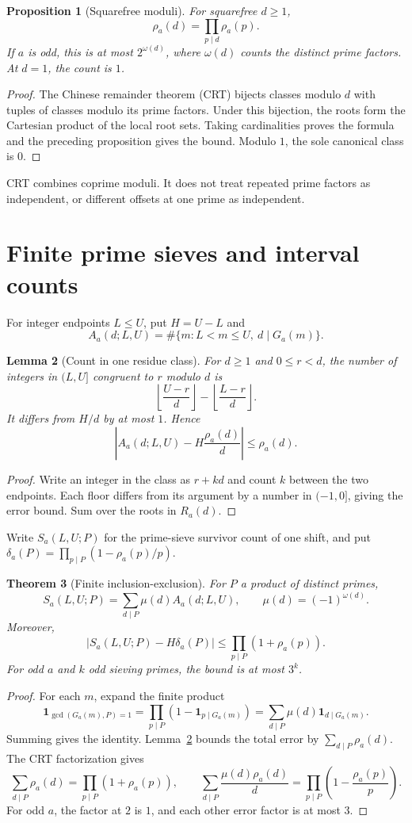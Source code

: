 \documentclass[11pt]{article}
\newtheorem{theorem}{Theorem}[section]
\newtheorem{proposition}[theorem]{Proposition}
\newtheorem{lemma}[theorem]{Lemma}
\theoremstyle{definition}
\theoremstyle{remark}
\newcommand{\ind}{\mathbf 1}
\begin{document}
\begin{proposition}[Squarefree moduli]\label{prop:crt}
For squarefree $d\ge1$,
\[
 \rho_a(d)=\prod_{p\mid d}\rho_a(p).
\]
If $a$ is odd, this is at most $2^{\omega(d)}$, where $\omega(d)$
counts the distinct prime factors. At $d=1$, the count is $1$.
\end{proposition}
\begin{proof}
The Chinese remainder theorem (CRT) bijects classes modulo $d$ with
tuples of classes modulo its prime factors. Under this bijection,
the roots form the Cartesian product of the local root sets.
Taking cardinalities proves the formula and the preceding proposition
gives the bound. Modulo $1$, the sole canonical class is $0$.
\end{proof}

CRT combines coprime moduli. It does not treat repeated prime factors
as independent, or different offsets at one prime as independent.

\section{Finite prime sieves and interval counts}
For integer endpoints $L\le U$, put $H=U-L$ and
\[
 A_a(d;L,U)=\#\{m:L<m\le U,\ d\mid G_a(m)\}.
\]
\begin{lemma}[Count in one residue class]\label{lem:interval}
For $d\ge1$ and $0\le r<d$, the number of integers in $(L,U]$
congruent to $r$ modulo $d$ is
\[
 \left\lfloor\frac{U-r}{d}\right\rfloor-
 \left\lfloor\frac{L-r}{d}\right\rfloor.
\]
It differs from $H/d$ by at most $1$. Hence
\[
 \left|A_a(d;L,U)-H\frac{\rho_a(d)}d\right|\le\rho_a(d).
\]
\end{lemma}
\begin{proof}
Write an integer in the class as $r+kd$ and count $k$ between the
two endpoints. Each floor differs from its argument by a number in
$(-1,0]$, giving the error bound. Sum over the roots in $R_a(d)$.
\end{proof}

Write $S_a(L,U;P)$ for the prime-sieve survivor count of one shift,
and put $\delta_a(P)=\prod_{p\mid P}(1-\rho_a(p)/p)$.
\begin{theorem}[Finite inclusion-exclusion]\label{thm:sieve}
For $P$ a product of distinct primes,
\[
 S_a(L,U;P)=\sum_{d\mid P}\mu(d)A_a(d;L,U),
 \qquad \mu(d)=(-1)^{\omega(d)}.
\]
Moreover,
\[
 \left|S_a(L,U;P)-H\delta_a(P)\right|
 \le\prod_{p\mid P}(1+\rho_a(p)).
\]
For odd $a$ and $k$ odd sieving primes, the bound is at most $3^k$.
\end{theorem}
\begin{proof}
For each $m$, expand the finite product
\[
 \ind_{\gcd(G_a(m),P)=1}
 =\prod_{p\mid P}(1-\ind_{p\mid G_a(m)})
 =\sum_{d\mid P}\mu(d)\ind_{d\mid G_a(m)}.
\]
Summing gives the identity. Lemma~\ref{lem:interval} bounds the total
error by $\sum_{d\mid P}\rho_a(d)$. The CRT factorization gives
\[
 \sum_{d\mid P}\rho_a(d)=\prod_{p\mid P}(1+\rho_a(p)),
 \qquad
 \sum_{d\mid P}\frac{\mu(d)\rho_a(d)}d
 =\prod_{p\mid P}\left(1-\frac{\rho_a(p)}p\right).
\]
For odd $a$, the factor at $2$ is $1$, and each other error factor
is at most $3$.
\end{proof}
\end{document}
